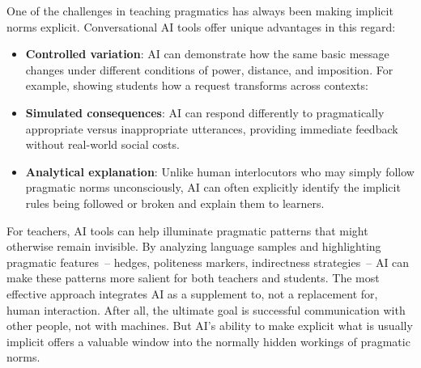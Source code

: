 One of the challenges in teaching pragmatics has always been making implicit norms explicit. Conversational AI tools offer unique advantages in this regard:
\begin{itemize}[noitemsep]
\item \textbf{Controlled variation}: AI can demonstrate how the same basic message changes under different conditions of power, distance, and imposition. For example, showing students how a request transforms across contexts:
\ea
   \z
\z

\item \textbf{Simulated consequences}: AI can respond differently to pragmatically appropriate versus inappropriate utterances, providing immediate feedback without real-world social costs.

\item \textbf{Analytical explanation}: Unlike human interlocutors who may simply follow pragmatic norms unconsciously, AI can often explicitly identify the implicit rules being followed or broken and explain them to learners.

\end{itemize}
For teachers, AI tools can help illuminate pragmatic patterns that might otherwise remain invisible. By analyzing language samples and highlighting pragmatic features~-- hedges, politeness markers, indirectness strategies~-- AI can make these patterns more salient for both teachers and students.
The most effective approach integrates AI as a supplement to, not a replacement for, human interaction. After all, the ultimate goal is successful communication with other people, not with machines. But AI's ability to make explicit what is usually implicit offers a valuable window into the normally hidden workings of pragmatic norms.

